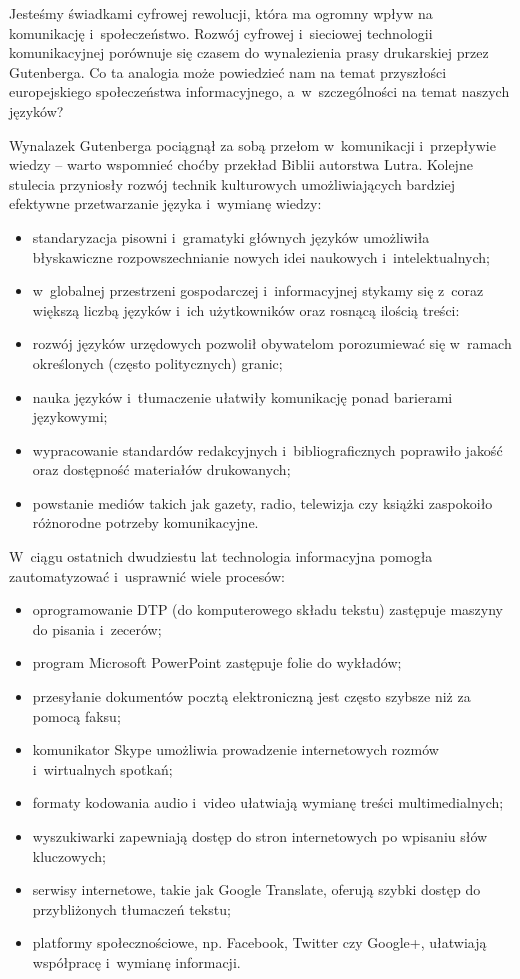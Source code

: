 \begin{multicols}{2} 

Jesteśmy świadkami cyfrowej rewolucji, która ma ogromny wpływ na
komunikację i~społeczeństwo. Rozwój cyfrowej i~sieciowej
technologii komunikacyjnej porównuje się czasem do wynalezienia
prasy drukarskiej przez Gutenberga. Co ta analogia może powiedzieć
nam na temat przyszłości europejskiego społeczeństwa
informacyjnego, a~w~szczególności na temat naszych języków? 


Wynalazek Gutenberga pociągnął za sobą przełom w~komunikacji
i~przepływie wiedzy – warto wspomnieć choćby przekład Biblii
autorstwa Lutra. Kolejne stulecia przyniosły rozwój technik
kulturowych umożliwiających bardziej efektywne przetwarzanie języka
i~wymianę wiedzy: 
\begin{itemize} \item standaryzacja pisowni
i~gramatyki głównych języków umożliwiła błyskawiczne
rozpowszechnianie nowych idei naukowych i~intelektualnych; \item
w~globalnej przestrzeni gospodarczej i~informacyjnej stykamy się
z~coraz większą liczbą języków i~ich użytkowników oraz
rosnącą ilością treści: \item rozwój języków urzędowych
pozwolił obywatelom porozumiewać się w~ramach określonych (często
politycznych) granic; \item nauka języków i~tłumaczenie ułatwiły
komunikację ponad barierami językowymi; \item wypracowanie
standardów redakcyjnych i~bibliograficznych poprawiło jakość oraz
dostępność materiałów drukowanych; \item powstanie mediów takich
jak gazety, radio, telewizja czy książki zaspokoiło różnorodne
potrzeby komunikacyjne. 
\end{itemize} 
W~ciągu ostatnich dwudziestu
lat technologia informacyjna pomogła zautomatyzować i~usprawnić
wiele procesów: 
\begin{itemize} \item oprogramowanie DTP (do
komputerowego składu tekstu) zastępuje maszyny do pisania
i~zecerów; \item program Microsoft PowerPoint zastępuje folie do
wykładów; \item przesyłanie dokumentów pocztą elektroniczną jest
często szybsze niż za pomocą faksu; \item komunikator Skype
umożliwia prowadzenie internetowych rozmów i~wirtualnych spotkań;
\item formaty kodowania audio i~video ułatwiają wymianę treści
multimedialnych; \item wyszukiwarki zapewniają dostęp do stron
internetowych po wpisaniu słów kluczowych; \item serwisy
internetowe, takie jak Google Translate, oferują szybki dostęp do
przybliżonych tłumaczeń tekstu; \item platformy społecznościowe,
np. Facebook, Twitter czy Google+, ułatwiają współpracę
i~wymianę informacji. 
\end{itemize} 


\end{multicols}
